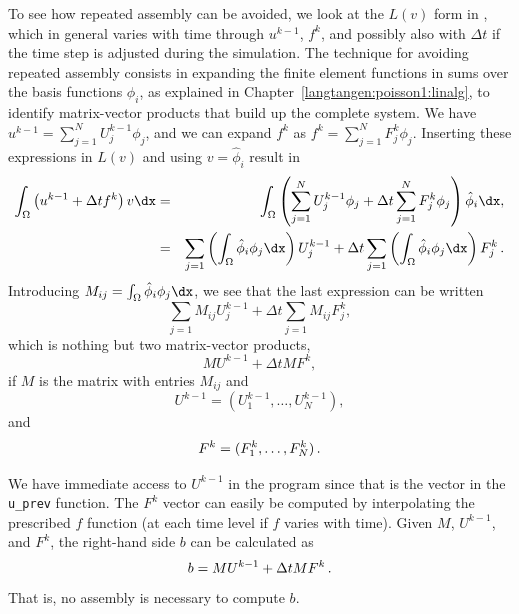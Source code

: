 To see how repeated assembly can be avoided, we look at the $L(v)$
form in , which in general varies with
time through $u^{k-1}$, $f^k$, and possibly also with $\Delta t$
if the time step is adjusted during the simulation.
The technique for avoiding repeated assembly consists in
expanding the finite element functions in sums over the basis functions
$\phi_i$, as explained
in Chapter~\ref{langtangen:poisson1:linalg}, to identify matrix-vector
products that build up the complete system. We have
$u^{k-1}=\sum_{j=1}^NU^{k-1}_j\phi_j$, and we can expand $f^k$ as
$f^{k}=\sum_{j=1}^NF^{k}_j\phi_j$. Inserting these expressions in $L(v)$
and using
$v=\hat\phi_i$ result in
\begin{eqnarray*}
\int_\Omega \left(u^{k-1} + \Delta tf^k\right)v\dx &=&
\int_\Omega \left(\sum_{j=1}^NU^{k-1}_j\phi_j + \Delta t\sum_{j=1}^NF^{k}_j\phi_j\right)\hat\phi_i\dx,\\
&=&\sum_{j=1}\left(\int_\Omega \hat\phi_i\phi_j\dx\right)U^{k-1}_j
 + \Delta t\sum_{j=1}\left(\int_\Omega \hat\phi_i\phi_j\dx\right)F^{k}_j\langtangenep
\end{eqnarray*}
Introducing $M_{ij} = \int_\Omega \hat\phi_i\phi_j\dx$, we see that
the last expression can be written
\[ \sum_{j=1}M_{ij}U^{k-1}_j + \Delta t \sum_{j=1}M_{ij}F^{k}_j,\]
which is nothing but two matrix-vector products,
\[ MU^{k-1} + \Delta t MF^k,\]
if $M$ is the matrix with entries $M_{ij}$ and
\[U^{k-1}=(U^{k-1}_1,\ldots,U^{k-1}_N),\]
and
\[ F^k=(F^{k}_1,\ldots,F^{k}_N)\thinspace .\]

We have immediate access to $U^{k-1}$
in the program since that is the vector
in the {\fontsize{12pt}{12pt}\verb!u_prev!} function. The $F^k$ vector can easily be
computed by interpolating the prescribed $f$ function (at each time level if
$f$ varies with time). Given $M$, $U^{k-1}$, and $F^k$, the right-hand side
$b$ can be calculated as
\[ b = MU^{k-1} + \Delta t MF^k \thinspace .\]
That is, no assembly is necessary to compute $b$.

